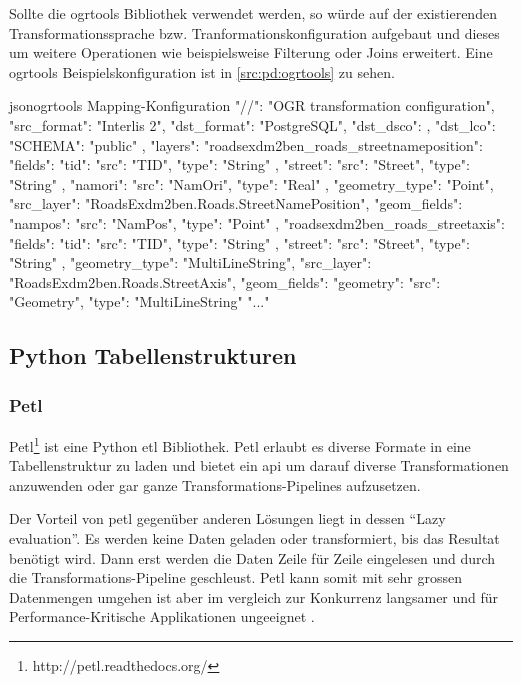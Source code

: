 Sollte die ogrtools Bibliothek verwendet werden, so würde auf der existierenden Transformationssprache bzw. Tranformationskonfiguration aufgebaut und dieses um weitere Operationen wie beispielsweise Filterung oder Joins erweitert. Eine ogrtools Beispielskonfiguration \cite[README, ogrtransform library]{ogrtools} ist in \cref{src:pd:ogrtools} zu sehen.


\begin{srclst}[label=src:pd:ogrtools]{json}{ogrtools Mapping-Konfiguration}
{
  "//": "OGR transformation configuration",
  "src_format": "Interlis 2",
  "dst_format": "PostgreSQL",
  "dst_dsco": {},
  "dst_lco": {
    "SCHEMA": "public"
  },
  "layers": {
    "roadsexdm2ben_roads_streetnameposition": {
      "fields": {
        "tid": {
          "src": "TID",
          "type": "String"
        },
        "street": {
          "src": "Street",
          "type": "String"
        },
        "namori": {
          "src": "NamOri",
          "type": "Real"
        }
      },
      "geometry_type": "Point",
      "src_layer": "RoadsExdm2ben.Roads.StreetNamePosition",
      "geom_fields": {
        "nampos": {
          "src": "NamPos",
          "type": "Point"
        }
      }
    },
    "roadsexdm2ben_roads_streetaxis": {
      "fields": {
        "tid": {
          "src": "TID",
          "type": "String"
        },
        "street": {
          "src": "Street",
          "type": "String"
        }
      },
      "geometry_type": "MultiLineString",
      "src_layer": "RoadsExdm2ben.Roads.StreetAxis",
      "geom_fields": {
        "geometry": {
          "src": "Geometry",
          "type": "MultiLineString"
        }
      }
    }
  }
  "..."
}
\end{srclst}

\subsection{Python Tabellenstrukturen}

\subsubsection{Petl}
Petl\footnote{http://petl.readthedocs.org/} ist eine Python \acs{etl} Bibliothek. Petl erlaubt es diverse Formate in eine Tabellenstruktur zu laden und bietet ein \acs{api} um darauf diverse Transformationen anzuwenden oder gar ganze Transformations-Pipelines aufzusetzen.

Der Vorteil von petl gegenüber anderen Lösungen liegt in dessen ``Lazy evaluation''. Es werden keine Daten geladen oder transformiert, bis das Resultat benötigt wird. Dann erst werden die Daten Zeile für Zeile eingelesen und durch die Transformations-Pipeline geschleust. Petl kann somit mit sehr grossen Datenmengen umgehen ist aber im vergleich zur Konkurrenz langsamer und für Performance-Kritische Applikationen ungeeignet \cite[Intro $\to$ Design goals]{petl}.


